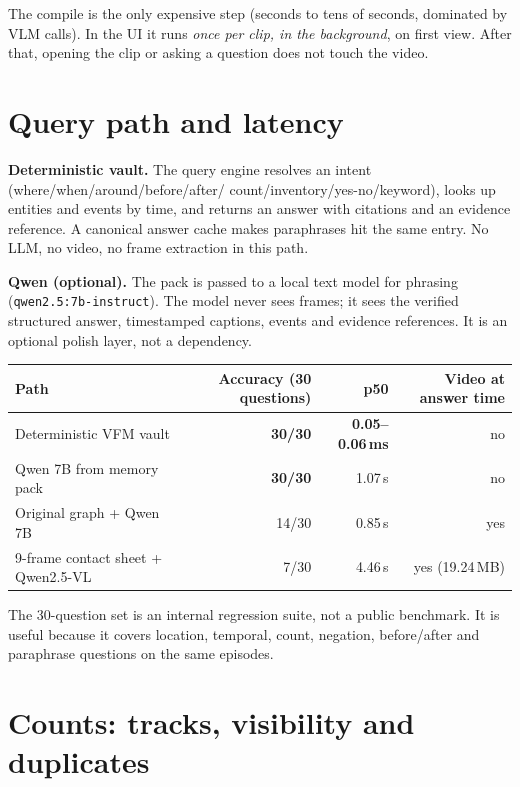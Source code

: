 \documentclass[10pt,a4paper]{article}
\newcommand{\code}[1]{\texttt{\small #1}}
\begin{document}
\noindent
The compile is the only expensive step (seconds to tens of seconds, dominated by VLM calls). In
the UI it runs \emph{once per clip, in the background}, on first view. After that, opening the clip
or asking a question does not touch the video.

\section{Query path and latency}

\textbf{Deterministic vault.} The query engine resolves an intent (where/when/around/before/after/
count/inventory/yes-no/keyword), looks up entities and events by time, and returns an answer with
citations and an evidence reference. A canonical answer cache makes paraphrases hit the same entry.
No LLM, no video, no frame extraction in this path.

\textbf{Qwen (optional).} The pack is passed to a local text model for phrasing
(\code{qwen2.5:7b-instruct}). The model never sees frames; it sees the verified structured answer,
timestamped captions, events and evidence references. It is an optional polish layer, not a
dependency.

\begin{center}
\small
\begin{tabularx}{\linewidth}{@{}X r r r@{}}
\toprule
Path & Accuracy (30 questions) & p50 & Video at answer time \\
\midrule
Deterministic VFM vault & \textbf{30/30} & \textbf{0.05--0.06\,ms} & no \\
Qwen 7B from memory pack & \textbf{30/30} & 1.07\,s & no \\
Original graph + Qwen 7B & 14/30 & 0.85\,s & yes \\
9-frame contact sheet + Qwen2.5-VL & 7/30 & 4.46\,s & yes (19.24\,MB) \\
\bottomrule
\end{tabularx}
\end{center}

\noindent
The 30-question set is an internal regression suite, not a public benchmark. It is useful because
it covers location, temporal, count, negation, before/after and paraphrase questions on the same
episodes.

\section{Counts: tracks, visibility and duplicates}
\label{sec:counts}
\end{document}
